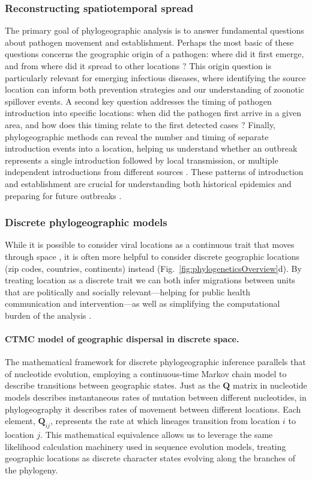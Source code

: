 \subsubsection{Reconstructing spatiotemporal spread}
The primary goal of phylogeographic analysis is to answer fundamental questions about pathogen movement and establishment.
Perhaps the most basic of these questions concerns the geographic origin of a pathogen: where did it first emerge, and from where did it spread to other locations \citep{dudas2017virus}?
This origin question is particularly relevant for emerging infectious diseases, where identifying the source location can inform both prevention strategies and our understanding of zoonotic spillover events.
A second key question addresses the timing of pathogen introduction into specific locations: when did the pathogen first arrive in a given area, and how does this timing relate to the first detected cases \citep{bedford2020cryptic}?
Finally, phylogeographic methods can reveal the number and timing of separate introduction events into a location, helping us understand whether an outbreak represents a single introduction followed by local transmission, or multiple independent introductions from different sources \citep{black2019genomic}.
These patterns of introduction and establishment are crucial for understanding both historical epidemics and preparing for future outbreaks \citep{kocher2021ten,gass2023global}.

\subsubsection{Discrete phylogeographic models}
While it is possible to consider viral locations as a continuous trait that moves through space \citep{lemey2010phylogeography}, it is often more helpful to consider discrete geographic locations (zip codes, countries, continents) instead (Fig.~\ref{fig:phylogeneticsOverview}d).
By treating location as a discrete trait we can both infer migrations between units that are politically and socially relevant---helping for public health communication and intervention---as well as simplifying the computational burden of the analysis \citep{lemey2009bayesian,faria2011toward}.

\paragraph*{CTMC model of geographic dispersal in discrete space.}
The mathematical framework for discrete phylogeographic inference parallels that of nucleotide evolution, employing a continuous-time Markov chain model to describe transitions between geographic states.
Just as the $\mathbf{Q}$ matrix in nucleotide models describes instantaneous rates of mutation between different nucleotides, in phylogeography it describes rates of movement between different locations.
Each element, $\mathbf{Q}_{ij}$, represents the rate at which lineages transition from location $i$ to location $j$.
This mathematical equivalence allows us to leverage the same likelihood calculation machinery used in sequence evolution models, treating geographic locations as discrete character states evolving along the branches of the phylogeny.

